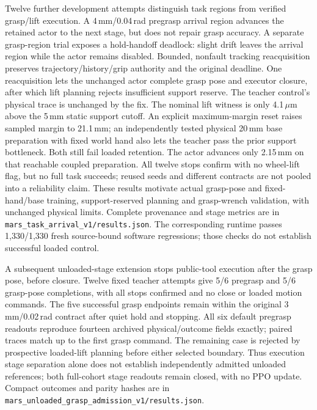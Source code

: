 Twelve further development attempts distinguish task regions from verified
grasp/lift execution. A 4\,mm/0.04\,rad pregrasp arrival region advances the
retained actor to the next stage, but does not repair grasp accuracy. A separate
grasp-region trial exposes a hold-handoff deadlock: slight drift leaves the
arrival region while the actor remains disabled. Bounded, nonfault tracking
reacquisition preserves trajectory/history/grip authority and the original
deadline. One reacquisition lets the unchanged actor complete grasp pose and
executor closure, after which lift planning rejects insufficient support reserve.
The teacher control's physical trace is unchanged by the fix. The nominal lift
witness is only 4.1\,$\mu$m above the 5\,mm static support cutoff. An explicit
maximum-margin reset raises sampled margin to 21.1\,mm; an independently tested
physical 20\,mm base preparation with fixed world hand also lets the teacher
pass the prior support bottleneck. Both still fail loaded retention. The actor
advances only 2.15\,mm on that reachable coupled preparation. All twelve stops
confirm with no wheel-lift flag, but no full task succeeds; reused seeds and
different contracts are not pooled into a reliability claim. These results
motivate actual grasp-pose and fixed-hand/base training, support-reserved
planning and grasp-wrench validation, with unchanged physical limits. Complete
provenance and stage metrics are in \texttt{mars\_task\_arrival\_v1/results.json}.
The corresponding runtime passes 1,330/1,330 fresh source-bound software
regressions; those checks do not establish successful loaded control.

A subsequent unloaded-stage extension stops public-tool execution after the
grasp pose, before closure. Twelve fixed teacher attempts give 5/6 pregrasp and
5/6 grasp-pose completions, with all stops confirmed and no close or loaded
motion commands. The five successful grasp endpoints remain within the original
3\,mm/0.02\,rad contract after quiet hold and stopping. All six default pregrasp
readouts reproduce fourteen archived physical/outcome fields exactly; paired
traces match up to the first grasp command. The remaining case is rejected by
prospective loaded-lift planning before either selected boundary. Thus execution
stage separation alone does not establish independently admitted unloaded
references; both full-cohort stage readouts remain closed, with no PPO update.
Compact outcomes and parity hashes are in
\texttt{mars\_unloaded\_grasp\_admission\_v1/results.json}.


